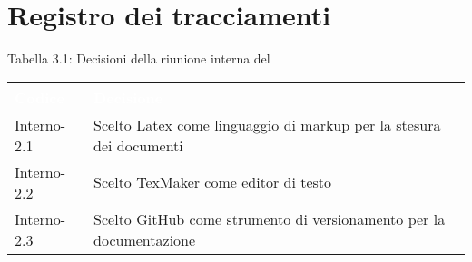 \section{Registro dei tracciamenti}
{
Tabella 3.1: Decisioni della riunione interna del \Data{}
\renewcommand{\arraystretch}{1.5}
\centering
\begin{longtable}{C{3cm} C{9cm}}
\textcolor{white}{\textbf{Codice}}&
\textcolor{white}{\textbf{Decisione}}\\	
\endhead
		
Interno-2.1 & Scelto Latex come linguaggio di markup per la stesura dei documenti\\

Interno-2.2 & Scelto TexMaker come editor di testo\\

Interno-2.3 & Scelto GitHub come strumento di versionamento per la documentazione\\
		
\end{longtable}
}
